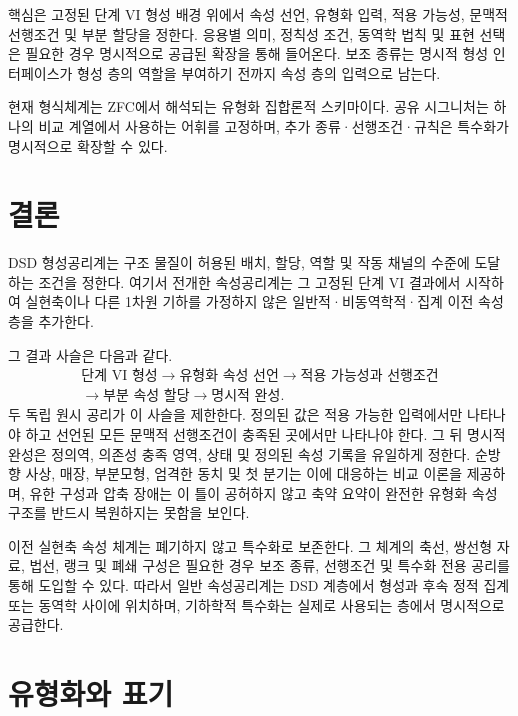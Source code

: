 \documentclass[11pt]{article}
\theoremstyle{definition}
\theoremstyle{remark}
\begin{document}
핵심은 고정된 단계 VI 형성 배경 위에서 속성 선언, 유형화 입력, 적용 가능성, 문맥적 선행조건 및 부분 할당을 정한다.
응용별 의미, 정칙성 조건, 동역학 법칙 및 표현 선택은 필요한 경우 명시적으로 공급된 확장을 통해 들어온다.
보조 종류는 명시적 형성 인터페이스가 형성 층의 역할을 부여하기 전까지 속성 층의 입력으로 남는다.

현재 형식체계는 ZFC에서 해석되는 유형화 집합론적 스키마이다.
공유 시그니처는 하나의 비교 계열에서 사용하는 어휘를 고정하며, 추가 종류·선행조건·규칙은 특수화가 명시적으로 확장할 수 있다.

\section{결론}
\label{sec:conclusion}

DSD 형성공리계는 구조 물질이 허용된 배치, 할당, 역할 및 작동 채널의 수준에 도달하는 조건을 정한다.
여기서 전개한 속성공리계는 그 고정된 단계 VI 결과에서 시작하여 실현축이나 다른 1차원 기하를 가정하지 않은 일반적·비동역학적·집계 이전 속성 층을 추가한다.

그 결과 사슬은 다음과 같다.
\[
\begin{gathered}
\text{단계 VI 형성}
\longrightarrow
\text{유형화 속성 선언}
\longrightarrow
\text{적용 가능성과 선행조건}\\
\longrightarrow
\text{부분 속성 할당}
\longrightarrow
\text{명시적 완성}.
\end{gathered}
\]
두 독립 원시 공리가 이 사슬을 제한한다. 정의된 값은 적용 가능한 입력에서만 나타나야 하고 선언된 모든 문맥적 선행조건이 충족된 곳에서만 나타나야 한다.
그 뒤 명시적 완성은 정의역, 의존성 충족 영역, 상태 및 정의된 속성 기록을 유일하게 정한다.
순방향 사상, 매장, 부분모형, 엄격한 동치 및 첫 분기는 이에 대응하는 비교 이론을 제공하며, 유한 구성과 압축 장애는 이 틀이 공허하지 않고 축약 요약이 완전한 유형화 속성 구조를 반드시 복원하지는 못함을 보인다.

이전 실현축 속성 체계는 폐기하지 않고 특수화로 보존한다.
그 체계의 축선, 쌍선형 자료, 법선, 랭크 및 폐쇄 구성은 필요한 경우 보조 종류, 선행조건 및 특수화 전용 공리를 통해 도입할 수 있다.
따라서 일반 속성공리계는 DSD 계층에서 형성과 후속 정적 집계 또는 동역학 사이에 위치하며, 기하학적 특수화는 실제로 사용되는 층에서 명시적으로 공급한다.

\appendix
\section{유형화와 표기}
\label{app:notation}
\end{document}
